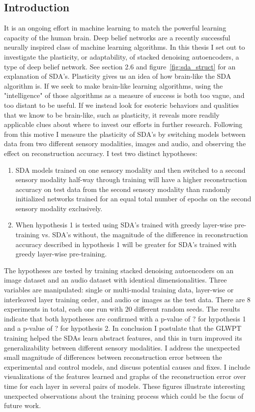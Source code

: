 \documentclass[12pt]{article}
\begin{document}
\begin{doublespacing}
	\subsection{Introduction}
		It is an ongoing effort in machine learning to match the powerful learning capacity of the human brain. Deep belief networks are a recently successful neurally inspired class of machine learning algorithms. In this thesis I set out to investigate the plasticity, or adaptability, of stacked denoising autoencoders, a type of deep belief network. See section 2.6 and figure~\ref{fig:sda_struct} for an explanation of SDA's. Plasticity gives us an idea of how brain-like the SDA algorithm is. If we seek to make brain-like learning algorithms, using the "intelligence" of those algorithms as a measure of success is both too vague, and too distant to be useful. If we instead look for esoteric behaviors and qualities that we know to be brain-like, such as plasticity, it reveals more readily applicable clues about where to invest our efforts in further research\cite{hinton1995wake}.
		Following from this motive I measure the plasticity of SDA's by switching models between data from two different sensory modalities, images and audio, and observing the effect on reconstruction accuracy. I test two distinct hypotheses:
\begin{enumerate}
	\item SDA models trained on one sensory modality and then switched to a second sensory modality half-way through training will have a higher reconstruction accuracy on test data from the second sensory modality than randomly initialized networks trained for an equal total number of epochs on the second sensory modality exclusively.
	\item When hypothesis 1 is tested using SDA's trained with greedy layer-wise pre-training vs. SDA's without, the magnitude of the difference in reconstruction accuracy described in hypothesis 1 will be greater for SDA's trained with greedy layer-wise pre-training.
\end{enumerate}
		The hypotheses are tested by training stacked denoising autoencoders on an image dataset and an audio dataset with identical dimensionalities. Three variables are manipulated: single or multi-modal training data, layer-wise or interleaved layer training order, and audio or images as the test data. There are 8 experiments in total, each one run with 20 different random seeds. The results indicate that both hypotheses are confirmed with a p-value of ? for hypothesis 1 and a p-value of ? for hypothesis 2.
		In conclusion I postulate that the GLWPT training helped the SDAs learn abstract features, and this in turn improved its generalizability between different sensory modalities. I address the unexpected small magnitude of differences between reconstruction error between the experimental and control models, and discuss potential causes and fixes. I include visualizations of the features learned and graphs of the reconstruction error over time for each layer in several pairs of models. These figures illustrate interesting unexpected observations about the training process which could be the focus of future work.


\end{doublespacing}
\end{document}
